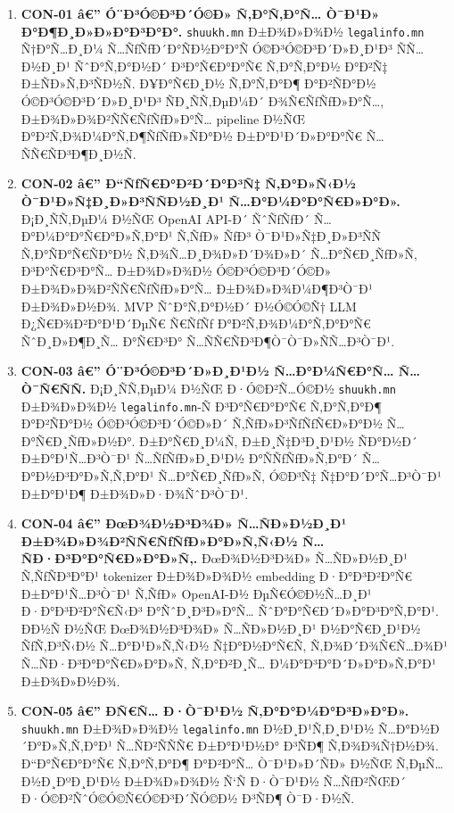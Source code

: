 \documentclass[12pt,A4]{report}
\begin{document}
\begin{enumerate}

    \item \textbf{CON-01 â€” Ó¨Ð³Ó©Ð³Ð´Ó©Ð» Ñ‚Ð°Ñ‚Ð°Ñ… Ò¯Ð¹Ð» Ð°Ð¶Ð¸Ð»Ð»Ð°Ð³Ð°Ð°.}
        \texttt{shuukh.mn} Ð±Ð¾Ð»Ð¾Ð½ \texttt{legalinfo.mn} Ñ†Ð°Ñ…Ð¸Ð¼
        Ñ…ÑƒÑƒÐ´Ð°ÑÐ½Ð°Ð°Ñ Ó©Ð³Ó©Ð³Ð´Ð»Ð¸Ð¹Ð³ ÑÑ…Ð½Ð¸Ð¹ ÑˆÐ°Ñ‚Ð°Ð½Ð´ Ð³Ð°Ñ€Ð°Ð°Ñ€ Ñ‚Ð°Ñ‚Ð°Ð½ Ð°Ð²Ñ‡
        Ð±ÑÐ»Ñ‚Ð³ÑÐ½Ñ. Ð¥Ð°Ñ€Ð¸Ð½ Ñ‚Ð°Ñ‚Ð°Ð¶ Ð°Ð²ÑÐ°Ð½ Ó©Ð³Ó©Ð³Ð´Ð»Ð¸Ð¹Ð³ ÑÐ¸ÑÑ‚ÐµÐ¼Ð´ Ð¾Ñ€ÑƒÑƒÐ»Ð°Ñ…,
        Ð±Ð¾Ð»Ð¾Ð²ÑÑ€ÑƒÑƒÐ»Ð°Ñ… pipeline Ð½ÑŒ Ð°Ð²Ñ‚Ð¾Ð¼Ð°Ñ‚Ð¶ÑƒÑƒÐ»ÑÐ°Ð½ Ð±Ð°Ð¹Ð´Ð»Ð°Ð°Ñ€
        Ñ…ÑÑ€ÑÐ³Ð¶Ð¸Ð½Ñ.

  \item \textbf{CON-02 â€” Ð“ÑƒÑ€Ð°Ð²Ð´Ð°Ð³Ñ‡ Ñ‚Ð°Ð»Ñ‹Ð½ Ò¯Ð¹Ð»Ñ‡Ð¸Ð»Ð³ÑÑÐ½Ð¸Ð¹
        Ñ…Ð°Ð¼Ð°Ð°Ñ€Ð»Ð°Ð».}
        Ð¡Ð¸ÑÑ‚ÐµÐ¼ Ð½ÑŒ OpenAI API-Ð´ ÑˆÑƒÑƒÐ´ Ñ…Ð°Ð¼Ð°Ð°Ñ€Ð°Ð»Ñ‚Ð°Ð¹ Ñ‚ÑƒÐ»
        ÑƒÐ³ Ò¯Ð¹Ð»Ñ‡Ð¸Ð»Ð³ÑÑ Ñ‚Ð°ÑÐ°Ñ€ÑÐ°Ð½ Ñ‚Ð¾Ñ…Ð¸Ð¾Ð»Ð´Ð¾Ð»Ð´ Ñ…Ð°Ñ€Ð¸ÑƒÐ»Ñ‚
        Ð³Ð°Ñ€Ð³Ð°Ñ… Ð±Ð¾Ð»Ð¾Ð½ Ó©Ð³Ó©Ð³Ð´Ó©Ð» Ð±Ð¾Ð»Ð¾Ð²ÑÑ€ÑƒÑƒÐ»Ð°Ñ… Ð±Ð¾Ð»Ð¾Ð¼Ð¶Ð³Ò¯Ð¹
        Ð±Ð¾Ð»Ð½Ð¾. MVP ÑˆÐ°Ñ‚Ð°Ð½Ð´ Ð½Ó©Ó©Ñ† LLM Ð¿Ñ€Ð¾Ð²Ð°Ð¹Ð´ÐµÑ€ Ñ€ÑƒÑƒ
        Ð°Ð²Ñ‚Ð¾Ð¼Ð°Ñ‚Ð°Ð°Ñ€ ÑˆÐ¸Ð»Ð¶Ð¸Ñ… Ð°Ñ€Ð³Ð° Ñ…ÑÑ€ÑÐ³Ð¶Ò¯Ò¯Ð»ÑÑ…Ð³Ò¯Ð¹.

  \item \textbf{CON-03 â€” Ó¨Ð³Ó©Ð³Ð´Ð»Ð¸Ð¹Ð½ Ñ…Ð°Ð¼Ñ€Ð°Ñ… Ñ…Ò¯Ñ€ÑÑ.}
        Ð¡Ð¸ÑÑ‚ÐµÐ¼ Ð½ÑŒ Ð·Ó©Ð²Ñ…Ó©Ð½ \texttt{shuukh.mn} Ð±Ð¾Ð»Ð¾Ð½
        \texttt{legalinfo.mn}-Ñ Ð³Ð°Ñ€Ð°Ð°Ñ€ Ñ‚Ð°Ñ‚Ð°Ð¶ Ð°Ð²ÑÐ°Ð½
        Ó©Ð³Ó©Ð³Ð´Ó©Ð»Ð´ Ñ‚ÑƒÐ»Ð³ÑƒÑƒÑ€Ð»Ð°Ð½ Ñ…Ð°Ñ€Ð¸ÑƒÐ»Ð½Ð°. Ð±Ð°Ñ€Ð¸Ð¼Ñ‚ Ð±Ð¸Ñ‡Ð³Ð¸Ð¹Ð½ ÑÐ°Ð½Ð´
        Ð±Ð°Ð¹Ñ…Ð³Ò¯Ð¹ Ñ…ÑƒÑƒÐ»Ð¸Ð¹Ð½ Ð°ÑÑƒÑƒÐ»Ñ‚Ð°Ð´ Ñ…Ð°Ð½Ð³Ð°Ð»Ñ‚Ñ‚Ð°Ð¹ Ñ…Ð°Ñ€Ð¸ÑƒÐ»Ñ‚
        Ó©Ð³Ñ‡ Ñ‡Ð°Ð´Ð°Ñ…Ð³Ò¯Ð¹ Ð±Ð°Ð¹Ð¶ Ð±Ð¾Ð»Ð·Ð¾ÑˆÐ³Ò¯Ð¹. 

  \item \textbf{CON-04 â€” ÐœÐ¾Ð½Ð³Ð¾Ð» Ñ…ÑÐ»Ð½Ð¸Ð¹ Ð±Ð¾Ð»Ð¾Ð²ÑÑ€ÑƒÑƒÐ»Ð°Ð»Ñ‚Ñ‹Ð½
        Ñ…ÑÐ·Ð³Ð°Ð°Ñ€Ð»Ð°Ð»Ñ‚.}
        ÐœÐ¾Ð½Ð³Ð¾Ð» Ñ…ÑÐ»Ð½Ð¸Ð¹ Ñ‚ÑƒÑÐ³Ð°Ð¹ tokenizer Ð±Ð¾Ð»Ð¾Ð½ embedding
        Ð·Ð°Ð³Ð²Ð°Ñ€ Ð±Ð°Ð¹Ñ…Ð³Ò¯Ð¹ Ñ‚ÑƒÐ» OpenAI-Ð½ ÐµÑ€Ó©Ð½Ñ…Ð¸Ð¹ Ð·Ð°Ð³Ð²Ð°Ñ€Ñ‹Ð³
        Ð°ÑˆÐ¸Ð³Ð»Ð°Ñ… ÑˆÐ°Ð°Ñ€Ð´Ð»Ð°Ð³Ð°Ñ‚Ð°Ð¹. Ð­Ð½Ñ Ð½ÑŒ ÐœÐ¾Ð½Ð³Ð¾Ð» Ñ…ÑÐ»Ð½Ð¸Ð¹
        Ð½Ð°Ñ€Ð¸Ð¹Ð½ ÑƒÑ‚Ð³Ñ‹Ð½ Ñ…Ð°Ð¹Ð»Ñ‚Ñ‹Ð½ Ñ‡Ð°Ð½Ð°Ñ€Ñ‚ Ñ‚Ð¾Ð´Ð¾Ñ€Ñ…Ð¾Ð¹
        Ñ…ÑÐ·Ð³Ð°Ð°Ñ€Ð»Ð°Ð»Ñ‚ Ñ‚Ð°Ð²Ð¸Ñ… Ð¼Ð°Ð³Ð°Ð´Ð»Ð°Ð»Ñ‚Ð°Ð¹ Ð±Ð¾Ð»Ð½Ð¾.

  \item \textbf{CON-05 â€” Ð­Ñ€Ñ… Ð·Ò¯Ð¹Ð½ Ñ‚Ð°Ð°Ð¼Ð°Ð³Ð»Ð°Ð».}
        \texttt{shuukh.mn} Ð±Ð¾Ð»Ð¾Ð½ \texttt{legalinfo.mn}
        Ð½Ð¸Ð¹Ñ‚Ð¸Ð¹Ð½ Ñ…Ð°Ð½Ð´Ð°Ð»Ñ‚Ñ‚Ð°Ð¹ Ñ…ÑÐ²ÑÑÑ€ Ð±Ð°Ð¹Ð½Ð° Ð³ÑÐ¶ Ñ‚Ð¾Ð¾Ñ†Ð½Ð¾.
        Ð“Ð°Ñ€Ð°Ð°Ñ€ Ñ‚Ð°Ñ‚Ð°Ð¶ Ð°Ð²Ð°Ñ… Ò¯Ð¹Ð»Ð´ÑÐ» Ð½ÑŒ Ñ‚ÐµÑ…Ð½Ð¸ÐºÐ¸Ð¹Ð½ Ð±Ð¾Ð»Ð¾Ð½
        Ñ‘Ñ Ð·Ò¯Ð¹Ð½ Ñ…ÑƒÐ²ÑŒÐ´ Ð·Ó©Ð²ÑˆÓ©Ó©Ñ€Ó©Ð³Ð´ÑÓ©Ð½ Ð³ÑÐ¶ Ò¯Ð·Ð½Ñ.


\end{enumerate}
\end{document}
